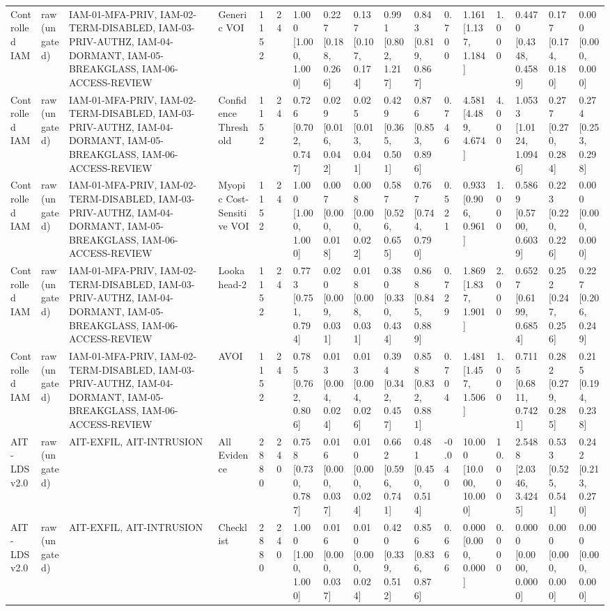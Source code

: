 \begin{table}[!ht]
{\begin{tabular}{lllllllllllllllll}
Controlled IAM & raw (ungated) & IAM-01-MFA-PRIV, IAM-02-TERM-DISABLED, IAM-03-PRIV-AUTHZ, IAM-04-DORMANT, IAM-05-BREAKGLASS, IAM-06-ACCESS-REVIEW & Generic VOI & 1152 & 24 & 1.000 [1.000, 1.000] & 0.227 [0.188, 0.266] & 0.137 [0.107, 0.174] & 0.991 [0.802, 1.217] & 0.843 [0.819, 0.867] & 0.700 & 1.161 [1.137, 1.184] & 1.000 & 0.4470 [0.4348, 0.4589] & 0.177 [0.174, 0.180] & 0.000 [0.000, 0.000] \\
Controlled IAM & raw (ungated) & IAM-01-MFA-PRIV, IAM-02-TERM-DISABLED, IAM-03-PRIV-AUTHZ, IAM-04-DORMANT, IAM-05-BREAKGLASS, IAM-06-ACCESS-REVIEW & Confidence Threshold & 1152 & 24 & 0.726 [0.702, 0.747] & 0.029 [0.016, 0.042] & 0.025 [0.013, 0.041] & 0.429 [0.365, 0.501] & 0.876 [0.853, 0.896] & 0.746 & 4.581 [4.489, 4.674] & 4.000 & 1.0533 [1.0124, 1.0946] & 0.277 [0.270, 0.284] & 0.274 [0.253, 0.298] \\
Controlled IAM & raw (ungated) & IAM-01-MFA-PRIV, IAM-02-TERM-DISABLED, IAM-03-PRIV-AUTHZ, IAM-04-DORMANT, IAM-05-BREAKGLASS, IAM-06-ACCESS-REVIEW & Myopic Cost-Sensitive VOI & 1152 & 24 & 1.000 [1.000, 1.000] & 0.007 [0.000, 0.018] & 0.008 [0.000, 0.022] & 0.587 [0.526, 0.655] & 0.767 [0.744, 0.790] & 0.521 & 0.933 [0.906, 0.961] & 1.000 & 0.5869 [0.5700, 0.6039] & 0.223 [0.220, 0.226] & 0.000 [0.000, 0.000] \\
Controlled IAM & raw (ungated) & IAM-01-MFA-PRIV, IAM-02-TERM-DISABLED, IAM-03-PRIV-AUTHZ, IAM-04-DORMANT, IAM-05-BREAKGLASS, IAM-06-ACCESS-REVIEW & Lookahead-2 & 1152 & 24 & 0.773 [0.751, 0.794] & 0.020 [0.009, 0.031] & 0.018 [0.008, 0.031] & 0.380 [0.330, 0.434] & 0.868 [0.845, 0.889] & 0.729 & 1.869 [1.837, 1.901] & 2.000 & 0.6527 [0.6199, 0.6854] & 0.252 [0.247, 0.256] & 0.227 [0.206, 0.249] \\
Controlled IAM & raw (ungated) & IAM-01-MFA-PRIV, IAM-02-TERM-DISABLED, IAM-03-PRIV-AUTHZ, IAM-04-DORMANT, IAM-05-BREAKGLASS, IAM-06-ACCESS-REVIEW & AVOI & 1152 & 24 & 0.785 [0.762, 0.806] & 0.013 [0.004, 0.024] & 0.013 [0.004, 0.026] & 0.394 [0.342, 0.457] & 0.858 [0.832, 0.881] & 0.704 & 1.481 [1.457, 1.506] & 1.000 & 0.7115 [0.6811, 0.7421] & 0.282 [0.279, 0.285] & 0.215 [0.194, 0.238] \\
AIT-LDS v2.0 & raw (ungated) & AIT-EXFIL, AIT-INTRUSION & All Evidence & 2880 & 240 & 0.758 [0.730, 0.787] & 0.016 [0.000, 0.037] & 0.010 [0.000, 0.024] & 0.662 [0.596, 0.741] & 0.481 [0.450, 0.514] & -0.040 & 10.000 [10.000, 10.000] & 10.000 & 2.5488 [2.0346, 3.4245] & 0.533 [0.525, 0.541] & 0.242 [0.213, 0.270] \\
AIT-LDS v2.0 & raw (ungated) & AIT-EXFIL, AIT-INTRUSION & Checklist & 2880 & 240 & 1.000 [1.000, 1.000] & 0.016 [0.000, 0.037] & 0.010 [0.000, 0.024] & 0.420 [0.339, 0.512] & 0.856 [0.836, 0.876] & 0.666 & 0.000 [0.000, 0.000] & 0.000 & 0.0000 [0.0000, 0.0000] & 0.000 [0.000, 0.000] & 0.000 [0.000, 0.000] \\

\end{tabular}}
\end{table}
